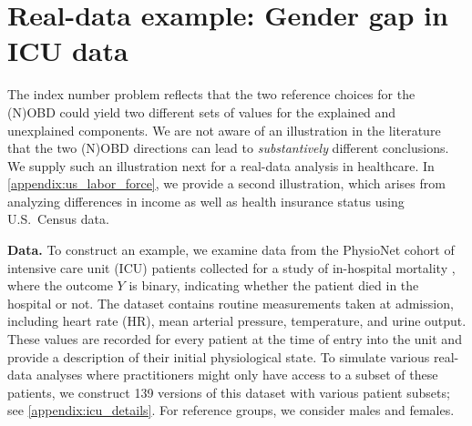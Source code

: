 \section{Real-data example: Gender gap in ICU data}
\label{sec:real_example}
The index number problem reflects that the two reference choices for the (N)OBD could yield two different sets of values for the explained and unexplained components. We are not aware of an illustration in the literature that the two (N)OBD directions can lead to \emph{substantively} different conclusions. We supply such an illustration next for a real-data analysis in healthcare. In \cref{appendix:us_labor_force}, we provide a second illustration, which arises from analyzing differences in income as well as health insurance status using U.S.\ Census data.

\textbf{Data.} To construct an example, we examine data from the PhysioNet cohort of intensive care unit (ICU) patients collected for a study of in-hospital mortality \citep{goldberger2000physiobank}, where the outcome $Y$ is binary, indicating whether the patient died in the hospital or not. The dataset contains routine measurements taken at admission, including heart rate (HR), mean arterial pressure, temperature, and urine output. These values are recorded for every patient at the time of entry into the unit and provide a description of their initial physiological state. To simulate various real-data analyses where practitioners might only have access to a subset of these patients, we construct 139 versions of this dataset with various patient subsets; see \cref{appendix:icu_details}.
For reference groups, we consider males and females.


